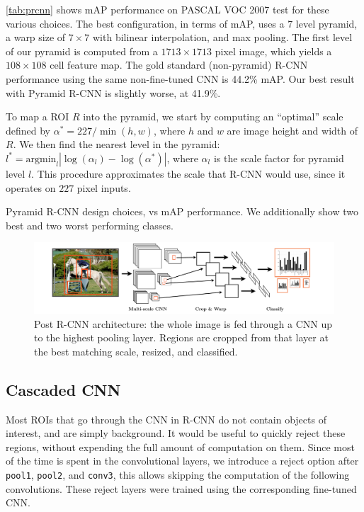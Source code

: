 \autoref{tab:prcnn} shows mAP performance on PASCAL VOC 2007 test for these various choices.
The best configuration, in terms of mAP, uses a 7 level pyramid, a warp size of $7 \times 7$ with bilinear interpolation, and max pooling.
The first level of our pyramid is computed from a $1713 \times 1713$ pixel image, which yields a $108 \times 108$ cell feature map.
The gold standard (non-pyramid) R-CNN performance using the same non-fine-tuned CNN is 44.2\% mAP.
Our best result with Pyramid R-CNN is slightly worse, at 41.9\%.

To map a ROI $R$ into the pyramid, we start by computing an ``optimal'' scale defined by $\alpha^* = 227/\min(h,w)$, where $h$ and $w$ are image height and width of $R$.
We then find the nearest level in the pyramid: $l^* = \textrm{argmin}_l |\log(\alpha_l) - \log(\alpha^*)|$, where $\alpha_l$ is the scale factor for pyramid level $l$.
This procedure approximates the scale that R-CNN would use, since it operates on $227$ pixel inputs.

\begin{table}[ht]
\centering
\caption{
    Pyramid R-CNN design choices, vs mAP performance.
    We additionally show two best and two worst performing classes.
}\label{tab:prcnn}
\small{

}
\end{table}

\begin{figure}[h!]
\begin{center}
\includegraphics[width=0.98\columnwidth]{figures/dense_rcnn.pdf}
\caption{
Post R-CNN architecture: the whole image is fed through a CNN up to the highest pooling layer.
Regions are cropped from that layer at the best matching scale, resized, and classified.
}\label{fig:dense_rcnn}
\end{center}
\end{figure}

\subsection{Cascaded CNN}\label{sec:ccnn}

Most ROIs that go through the CNN in R-CNN do not contain objects of interest, and are simply background.
It would be useful to quickly reject these regions, without expending the full amount of computation on them. Since most of the time is spent in the convolutional layers, we introduce a reject option after \texttt{pool1}, \texttt{pool2}, and \texttt{conv3}, this allows skipping the computation of the following convolutions. These reject layers were trained using the corresponding fine-tuned CNN.

